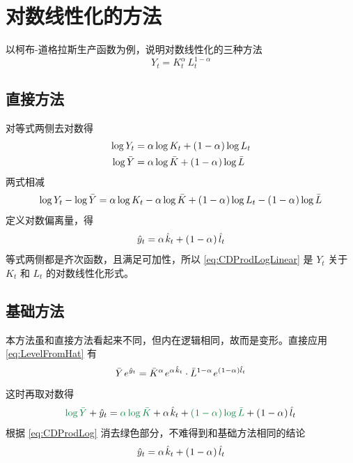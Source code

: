 \section{对数线性化的方法}\label{sec:LogLineMethod}

以柯布-道格拉斯生产函数为例，说明对数线性化的三种方法
\begin{equation}
    Y_t=K_t^\alpha\,L_t^{1-\alpha}\label{eq:CDProdExample}
\end{equation}

\subsection{直接方法}\label{subsec:LogLineBasic}

对等式两侧去对数得
\begin{align}
    \operatorname{log} Y_t & = \alpha\operatorname{log} K_t + \left(\mspace{1mu}1-\alpha\mspace{1mu}\right)\operatorname{log} L_t\notag\\ 
    \operatorname{log} \bar Y & = \alpha\operatorname{log} \bar K + \left(\mspace{1mu}1-\alpha\mspace{1mu}\right)\operatorname{log} \bar L\label{eq:CDProdLog}
\end{align}
两式相减
\begin{equation}
    \operatorname{log} Y_t - \operatorname{log} \bar Y = \alpha\operatorname{log} K_t - \alpha\operatorname{log} \bar K + \left(\mspace{1mu}1-\alpha\mspace{1mu}\right)\operatorname{log} L_t - \left(\mspace{1mu}1-\alpha\mspace{1mu}\right)\operatorname{log} \bar L
\end{equation}
定义对数偏离量，得
\begin{equation}
    \hat y_t = \alpha\,\hat k_t + \bka{1-\alpha}\hat l_t\label{eq:CDProdLogLinear}
\end{equation}
等式两侧都是齐次函数，且满足可加性，所以 \ref{eq:CDProdLogLinear} 是 \(Y_t\) 关于 \(K_t\) 和 \(L_t\) 的对数线性化形式。

\subsection{基础方法}\label{subsec:LogLineTransform}

本方法虽和直接方法看起来不同，但内在逻辑相同，故而是变形。直接应用 \ref{eq:LevelFromHat} 有
\begin{equation}
    \bar Y\,e^{\hat y_t}=\bar K^\alpha\,e^{\alpha\,\hat k_t}\cdot \bar L^{1-\alpha}\,e^{\bka{1-\alpha}\hat l_t}
\end{equation}
这时再取对数得
\begin{equation}
    \fafugreen{\log\bar Y}+\hat y_t=\fafugreen{\alpha\log\bar K}+\alpha\,\hat k_t+\fafugreen{\bka{1-\alpha}\log\bar L}+\bka{1-\alpha}\hat l_t
\end{equation}
根据 \ref{eq:CDProdLog} 消去绿色部分，不难得到和基础方法相同的结论
\begin{equation}
    \hat y_t=\alpha\,\hat k_t+\bka{1-\alpha}\hat l_t\notag
\end{equation}


